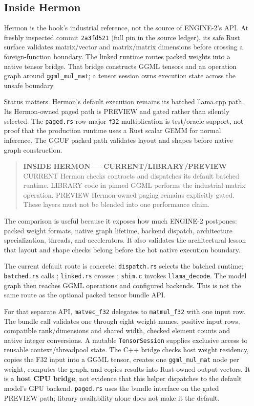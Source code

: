 \documentclass[
  10pt,
]{article}
\begin{document}
\subsection{Inside Hermon}\label{inside-hermon-2}

Hermon is the book's industrial reference, not the source of ENGINE-2's
API. At freshly inspected commit \texttt{2a3fd521} (full pin in the
source ledger), its safe Rust surface validates matrix/vector and
matrix/matrix dimensions before crossing a foreign-function boundary.
The linked runtime routes packed weights into a native tensor bridge.
That bridge constructs GGML tensors and an operation graph around
\texttt{ggml\_mul\_mat}; a tensor session owns execution state across
the unsafe boundary.

Status matters. Hermon's default execution remains its batched llama.cpp
path. Its Hermon-owned paged path is PREVIEW and gated rather than
silently selected. The \texttt{paged.rs} row-major \texttt{f32}
multiplication is test/oracle support, not proof that the production
runtime uses a Rust scalar GEMM for normal inference. The GGUF packed
path validates layout and shapes before native graph construction.

\begin{quote}
\textbf{INSIDE HERMON --- CURRENT/LIBRARY/PREVIEW} CURRENT Hermon checks
contracts and dispatches its default batched runtime. LIBRARY code in
pinned GGML performs the industrial matrix operation. PREVIEW
Hermon-owned paging remains explicitly gated. These layers must not be
blended into one performance claim.
\end{quote}

The comparison is useful because it exposes how much ENGINE-2 postpones:
packed weight formats, native graph lifetime, backend dispatch,
architecture specialization, threads, and accelerators. It also
validates the architectural lesson that layout and shape checks belong
before the hot native execution boundary.

The current default route is concrete: \texttt{dispatch.rs} selects the
batched runtime; \texttt{batched.rs} calls
\texttt{}; \texttt{linked.rs} crosses
\texttt{}; \texttt{shim.c}
invokes \texttt{llama\_decode}. The model graph then reaches GGML
operations and configured backends. This is not the same route as the
optional packed tensor bundle API.

For that separate API, \texttt{matvec\_f32} delegates to
\texttt{matmul\_f32} with one input row. The bundle call validates one
through eight weight names, positive input rows, compatible
rank/dimensions and shared width, checked element counts and native
integer conversions. A mutable \texttt{TensorSession} supplies exclusive
access to reusable context/threadpool state. The C++ bridge checks host
weight residency, copies the F32 input into a GGML tensor, creates one
\texttt{ggml\_mul\_mat} node per weight, computes the graph, and copies
results into Rust-owned output vectors. It is a \textbf{host CPU
bridge}, not evidence that this helper dispatches to the default model's
GPU backend. \texttt{paged.rs} uses the bundle interface on the gated
PREVIEW path; library availability alone does not make it the default.
\end{document}
